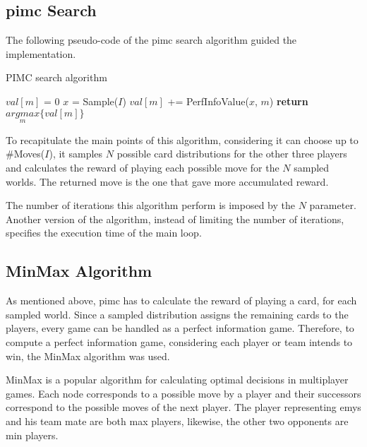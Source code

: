 \subsection*{\ac{pimc} Search}

The following pseudo-code of the \ac{pimc} search algorithm guided the implementation.

\begin{algorithm}
	\caption{PIMC search algorithm}
	\begin{algorithmic}[1]
				\State $val[m]$ = 0
			\EndFor
				\State $x$ = Sample($I$)
					\State $val[m]$ += PerfInfoValue($x$, $m$)
				\EndFor
			\EndFor
			\State \textbf{return} $\underset{m}{argmax}\{ val[m] \}$
		\EndProcedure
	\end{algorithmic}
\end{algorithm}

To recapitulate the main points of this algorithm, considering it can choose up to \#Moves($I$), it samples $N$ possible card distributions for the other three players and calculates the reward of playing each possible move for the $N$ sampled worlds.
The returned move is the one that gave more accumulated reward.

The number of iterations this algorithm perform is imposed by the $N$ parameter.
Another version of the algorithm, instead of limiting the number of iterations, specifies the execution time of the main loop.

\subsection*{MinMax Algorithm}

As mentioned above, \ac{pimc} has to calculate the reward of playing a card, for each sampled world.
Since a sampled distribution assigns the remaining cards to the players, every game can be handled as a perfect information game.
Therefore, to compute a perfect information game, considering each player or team intends to win, the MinMax algorithm was used.

MinMax is a popular algorithm for calculating optimal decisions in multiplayer games.
Each node corresponds to a possible move by a player and their successors correspond to the possible moves of the next player.
The player representing \ac{emys} and his team mate are both max players, likewise, the other two opponents are min players.

